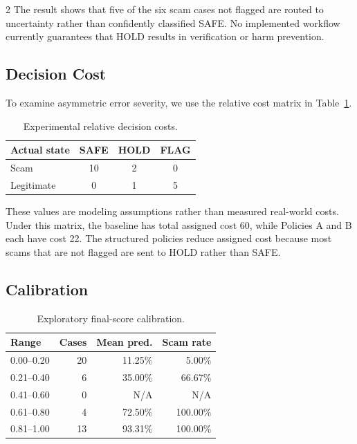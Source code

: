 \documentclass{article}
\begin{document}
\begin{multicols}{2}
The result shows that five of the six scam cases not flagged are routed to uncertainty rather than confidently classified SAFE. No implemented workflow currently guarantees that HOLD results in verification or harm prevention.

\subsection{Decision Cost}

To examine asymmetric error severity, we use the relative cost matrix in Table~\ref{tab:costmatrix}.

\begin{table}[t]
\centering
\caption{Experimental relative decision costs.}
\label{tab:costmatrix}
\begin{tabular}{lccc}
\toprule
Actual state & SAFE & HOLD & FLAG \\
\midrule
Scam & 10 & 2 & 0 \\
Legitimate & 0 & 1 & 5 \\
\bottomrule
\end{tabular}
\end{table}

These values are modeling assumptions rather than measured real-world costs. Under this matrix, the baseline has total assigned cost 60, while Policies A and B each have cost 22. The structured policies reduce assigned cost because most scams that are not flagged are sent to HOLD rather than SAFE.

\subsection{Calibration}

\begin{table}[t]
\centering
\caption{Exploratory final-score calibration.}
\label{tab:calibration}
\begin{tabular}{lrrr}
\toprule
Range & Cases & Mean pred. & Scam rate \\
\midrule
0.00--0.20 & 20 & 11.25\% & 5.00\% \\
0.21--0.40 & 6 & 35.00\% & 66.67\% \\
0.41--0.60 & 0 & N/A & N/A \\
0.61--0.80 & 4 & 72.50\% & 100.00\% \\
0.81--1.00 & 13 & 93.31\% & 100.00\% \\
\bottomrule
\end{tabular}
\end{table}


\end{multicols}
\end{document}
